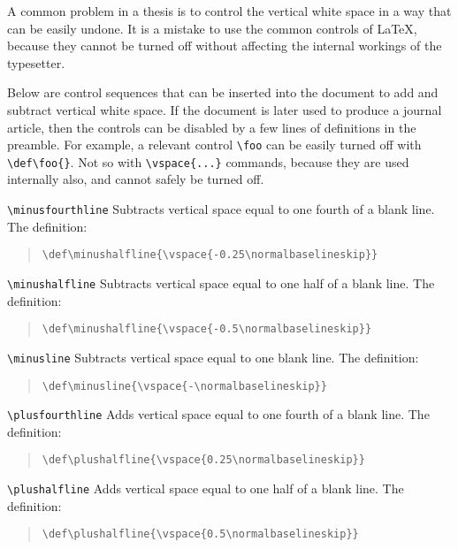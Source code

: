 A common problem in a thesis is to control the vertical white space in a
way that can be easily undone. It is a mistake to use the common
controls of \LaTeX{}, because they cannot be turned off without
affecting the internal workings of the typesetter.

Below are control sequences that can be inserted into the document to
add and subtract vertical white space. If the document is later used to
produce a journal article, then the controls can be disabled by a few
lines of definitions in the preamble. For example, a relevant control
\verb"\foo" can be easily turned off with \verb"\def\foo{}". Not so with
\verb"\vspace{...}" commands, because they are used internally also, and
cannot safely be turned off.


\begin{description}
\item \verb|\minusfourthline|
Subtracts vertical space equal to one fourth of a blank line.
The
definition:
\begin{quote}
\verb|\def\minushalfline{\vspace{-0.25\normalbaselineskip}}|
\end{quote}

\item \verb|\minushalfline|
Subtracts vertical space equal to one half of a blank line. The
definition:
\begin{quote}
\verb|\def\minushalfline{\vspace{-0.5\normalbaselineskip}}|
\end{quote}

\item \verb|\minusline|
Subtracts vertical space equal to one blank line. The definition:
\begin{quote}
\verb|\def\minusline{\vspace{-\normalbaselineskip}}|
\end{quote}

\item \verb|\plusfourthline|
Adds vertical space equal to one fourth of a blank line. The definition:
\begin{quote}
\verb|\def\plushalfline{\vspace{0.25\normalbaselineskip}}|
\end{quote}

\item \verb|\plushalfline|
Adds vertical space equal to one half of a blank line. The definition:
\begin{quote}
\verb|\def\plushalfline{\vspace{0.5\normalbaselineskip}}|
\end{quote}


\end{description}
